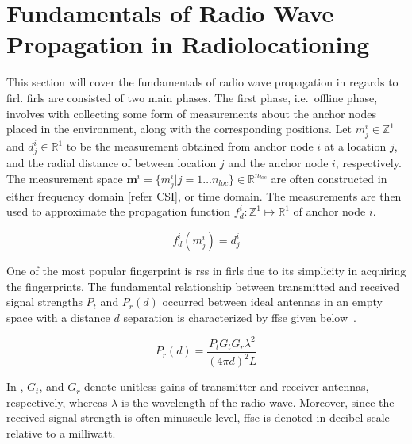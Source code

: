 \section{Fundamentals of Radio Wave Propagation in Radiolocationing}
\label{sec:fundamentals}
    This section will cover the fundamentals of radio wave propagation in regards to \gls{firl}.
    \Gls{firl}s are consisted of two main phases.
    The first phase, i.e.\ offline phase,  involves with collecting some form of measurements about the anchor nodes placed in the environment, along with the corresponding positions.
    Let $m^i_j \in \mathbb{Z}^1$ and $d^i_j \in \mathbb{R}^1$ to be the measurement obtained from anchor node $i$ at a location $j$, and the radial distance of between location $j$ and the anchor node $i$, respectively.
    The measurement space $\bm{m}^i=\{m^i_j | j=1 \ldots n_{loc}\} \in \mathbb{R}^{n_{loc}}$ are often constructed in either frequency domain [refer CSI], or time domain.
    The measurements are then used to approximate the propagation function $f^i_d:\mathbb{Z}^1\mapsto\mathbb{R}^1$ of anchor node $i$.

    \begin{equation}
        f^i_d(m^i_j)=d^i_j
    \end{equation}

    One of the most popular fingerprint is \gls{rss} in \gls{firl}s due to its simplicity in acquiring the fingerprints.
    The fundamental relationship between transmitted and received signal strengths $P_t$ and $P_r(d)$ occurred between ideal antennas in an empty space with a distance $d$ separation is characterized by \gls{ffse} given below~\cite{friis1946note}.

    \begin{equation}
        \label{eq:friisWatts}
            P_r(d) = \dfrac{P_t  G_t  G_r \lambda^2}{{\left(4 \pi d\right)}^2 L}
    \end{equation}

    In , $G_t$, and $G_r$ denote unitless gains of transmitter and receiver antennas, respectively, whereas $\lambda$ is the wavelength of the radio wave.
    Moreover, since the received signal strength is often minuscule level, \gls{ffse} is denoted in decibel scale relative to a milliwatt.

